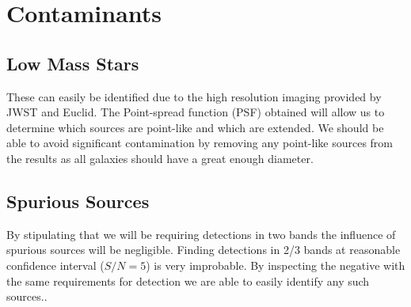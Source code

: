 
\section{Contaminants} %
\label{sec:contaminants}
    \subsection{Low Mass Stars} %
    \label{sub:low_mass_stars}
        These can easily be identified due to the high resolution imaging provided by JWST and Euclid. The Point-spread function (PSF) obtained will allow us to determine which sources are point-like and which are extended. We should be able to avoid significant contamination by removing any point-like sources from the results as all galaxies should have a great enough diameter.

    \subsection{Spurious Sources} %
    \label{sub:spurious_sources}
        By stipulating that we will be requiring detections in two bands the influence of spurious sources will be negligible. Finding detections in 2/3 bands at reasonable confidence interval ($S/N =5$) is very improbable. By inspecting the negative with the same requirements for detection we are able to easily identify any such sources.\cite{Bouwens2011}.

